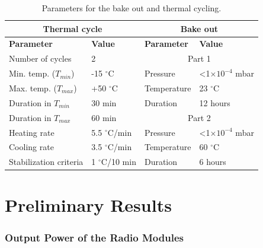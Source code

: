\begin{table}[!h]
    \begin{center}
        \begin{tabular}{llll}
            \toprule[1.5pt]
            \multicolumn{2}{c}{\textbf{Thermal cycle}}  & \multicolumn{2}{c}{\textbf{Bake out}}        \\
            \midrule
            \textbf{Parameter}     & \textbf{Value}     & \textbf{Parameter} & \textbf{Value}          \\
            \midrule
            Number of cycles       & 2                  & \multicolumn{2}{c}{Part 1}                   \\
            \cmidrule{3-4}
            Min. temp. ($T_{min}$) & -15 $^\circ$C      & Pressure           & <1$\times 10^{-4}$ mbar \\
            Max. temp. ($T_{max}$) & +50 $^\circ$C      & Temperature        & 23 $^\circ$C            \\
            Duration in $T_{min}$  & 30 min             & Duration           & 12 hours                \\
            \cmidrule{3-4}
            Duration in $T_{max}$  & 60 min             & \multicolumn{2}{c}{Part 2}                   \\
            \cmidrule{3-4}
            Heating rate           & 5.5 $^\circ$C/min  & Pressure           & <1$\times 10^{-4}$ mbar \\
            Cooling rate           & 3.5 $^\circ$C/min  & Temperature        & 60 $^\circ$C            \\
            Stabilization criteria & 1 $^\circ$C/10 min & Duration           & 6 hours                 \\
            \bottomrule[1.5pt]
        \end{tabular}
        \caption{Parameters for the bake out and thermal cycling.}
        \label{tab:fsat-thermal-cycling}
    \end{center}
\end{table}



\section{Preliminary Results}


\subsubsection{Output Power of the Radio Modules}

